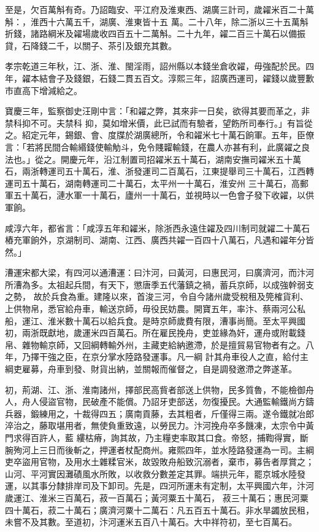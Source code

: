 \begin{pinyinscope}
 至是，欠百萬斛有奇。乃詔臨安、平江府及淮東西、湖廣三計司，歲糴米百二十萬斛：，淮西十六萬五千，湖廣、淮東皆十五
 萬。二十八年，除二浙以三十五萬斛折錢，諸路綱米及糴場歲收四百五十二萬斛。二十九年，糴二百三十萬石以備振貸，石降錢二千，以關子、茶引及銀充其數。



 孝宗乾道三年秋，江、浙、淮、閩淫雨，詔州縣以本錢坐倉收糴，毋強配於民。四年，糴本結會子及錢銀，石錢二貫五百文。淳熙三年，詔廣西運司，糴錢以歲豐歉市直高下增減給之。



 寶慶三年，監察御史汪剛中言：「和糴之弊，其來非一日矣，欲得其要而革之，非禁科抑不可。夫禁科
 抑，莫如增米價，此已試而有驗者，望飭所司奉行。」有旨從之。紹定元年，錫銀、會、度牒於湖廣總所，令和糴米七十萬石餉軍。五年，臣僚言：「若將民間合輸緡錢使輸觔斗，免令賤糶輸錢，在農人亦甚有利，此廣糴之良法也。」從之。開慶元年，沿江制置司招糴米五十萬石，湖南安撫司糴米五十萬石，兩浙轉運司五十萬石，淮、浙發運司二百萬石，江東提舉司三十萬石，江西轉運司五十萬石，湖南轉運司二十萬石，太平州一十萬石，淮安州
 三十萬石，高郵軍五十萬石，漣水軍一十萬石，廬州一十萬石，並視時以一色會子發下收糴，以供軍餉。



 咸淳六年，都省言：「咸淳五年和糴米，除浙西永遠住糴及四川制司就糴二十萬石樁充軍餉外，京湖制司、湖南、江西、廣西共糴一百四十八萬石，凡遇和糴年分皆然。」



 漕運宋都大梁，有四河以通漕運：曰汴河，曰黃河，曰惠民河，曰廣濟河，而汴河所漕為多。太祖起兵間，有天下，懲唐季五代藩鎮之禍，蓄兵京師，以成強幹弱支之勢，
 故於兵食為重。建隆以來，首浚三河，令自今諸州歲受稅租及筦榷貨利、上供物帛，悉官給舟車，輸送京師，毋役民妨農。開寶五年，率汴、蔡兩河公私船，運江、淮米數十萬石以給兵食。是時京師歲費有限，漕事尚簡。至太平興國初，兩浙既獻地，歲運米四百萬石。所在雇民挽舟，吏並緣為奸，運舟或附載錢帛、雜物輸京師，又回綱轉輸外州，主藏吏給納邀滯，於是擅貿易官物者有之。八年，乃擇干強之臣，在京分掌水陸路發運事。凡一綱
 計其舟車役人之直，給付主綱吏雇募，舟車到發、財貨出納，並關報而催督之，自是調發邀滯之弊遂革。



 初，荊湖、江、浙、淮南諸州，擇部民高貲者部送上供物，民多質魯，不能檢御舟人，舟人侵盜官物，民破產不能償。乃詔牙吏部送，勿復擾民。大通監輸鐵尚方鑄兵器，鍛練用之，十裁得四五；廣南貢藤，去其粗者，斤僅得三兩。遂令鐵就冶郎淬治之，藤取堪用者，無使負重致遠，以勞民力。汴河挽舟卒多饑凍，太宗令中黃門求得百許人，藍
 縷枯瘠，詢其故，乃主糧吏率取其口食。帝怒，捕鞫得實，斷腕殉河上三日而後斬之，押運者杖配商州。雍熙四年，並水陸路發運為一司。主綱吏卒盜用官物，及用水土雜糅官米，故毀敗舟船致沉溺者，棄市，募告者厚賞之；山河、平河實因灘磧風水所敗，以收救分數差定其罪。端拱元年，罷京城水陸發運，以其事分隸排岸司及下卸司。先是，四河所運未有定制，太平興國六年，汴河歲運江、淮米三百萬石，菽一百萬石；黃河粟五十萬石，
 菽三十萬石；惠民河粟四十萬石，菽二十萬石；廣濟河粟十二萬石：凡五百五十萬石。非水旱蠲放民租，未嘗不及其數。至道初，汴河運米五百八十萬石。大中祥符初，至七百萬石。




\end{pinyinscope}
